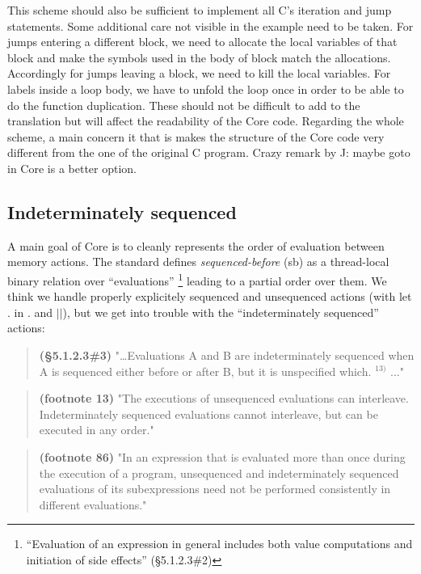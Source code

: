 \documentclass[12pt, a4paper]{article}
\newcommand{\TODO}[1]{{\color{red} #1}}
\newcommand{\syn}[1]{\textsf{#1}} %
\begin{document}
This scheme should also be sufficient to implement all C's iteration and jump statements.
Some additional care not visible in the example need to be taken.
For jumps entering a different block, we need to allocate the local variables of that block and make the symbols used in the body of block match the allocations. Accordingly for jumps leaving a block, we need to kill the local variables.
For labels inside a loop body, we have to unfold the loop once in order to be able to do the function duplication.
These should not be difficult to add to the translation but will affect the readability of the Core code.
Regarding the whole scheme, a main concern it that is makes the structure of the Core code very different from the one of the
original C program. \TODO{Crazy remark by J: maybe goto in Core is a better option.}




\subsection{Indeterminately sequenced}
A main goal of Core is to cleanly represents the order of evaluation between memory actions. The standard defines {\it sequenced-before} (sb) as a thread-local binary relation over ``evaluations'' \footnote{``Evaluation of an expression in general includes both value computations and initiation of side effects'' (§5.1.2.3\#2)} leading to a partial order over them. We think we handle properly explicitely sequenced and unsequenced actions (with \syn{let} . \syn {in} . and $||$), but we get into trouble with the ``indeterminately sequenced'' actions:

\begin{quote}
  {\bf (§5.1.2.3\#3)}
  "\dots Evaluations A and B are indeterminately sequenced when A is sequenced either before or after B, but it is unspecified which. ${}^{13)}$ ..."
\end{quote}
  
\begin{quote}
  {\bf(footnote 13)}
  "The executions of unsequenced evaluations can interleave. Indeterminately sequenced evaluations cannot interleave, but can be executed in any order."
\end{quote}

\begin{quote}
  {\bf(footnote 86)}
  "In an expression that is evaluated more than once during the execution of a program, unsequenced and indeterminately sequenced evaluations of its subexpressions need not be performed consistently in different evaluations."
\end{quote}
\end{document}
